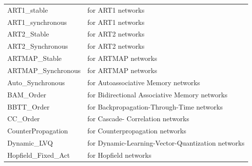 {\newpage
\clearpage
\samepage \begin{tabular}{|l|l|}
\hline
ART1\_stable \hspace{0.5cm} & \hspace{0.5cm} for ART1 networks\\  
ART1\_synchronous \hspace{0.5cm} & \hspace{0.5cm} for ART1 networks\\ 
ART2\_Stable \hspace{0.5cm} & \hspace{0.5cm} for ART2 networks\\ 
ART2\_Synchronous  \hspace{0.5cm} & \hspace{0.5cm} for ART2 networks\\ 
ARTMAP\_Stable  \hspace{0.5cm} & \hspace{0.5cm} for ARTMAP networks\\ 
ARTMAP\_Synchronous  \hspace{0.5cm} & \hspace{0.5cm} for ARTMAP networks\\ 
Auto\_Synchronous  \hspace{0.5cm} & \hspace{0.5cm} for Autoassociative Memory networks\\ 
BAM\_Order \hspace{0.5cm} & \hspace{0.5cm} for Bidirectional Associative Memory networks\\ 
BBTT\_Order \hspace{0.5cm} & \hspace{0.5cm} for Backpropagation-Through-Time networks\\ 
CC\_Order \hspace{0.5cm} & \hspace{0.5cm} for Cascade- Correlation networks\\ 
CounterPropagation \hspace{0.5cm} & \hspace{0.5cm} for Counterpropagation networks\\ 
Dynamic\_LVQ \hspace{0.5cm} & \hspace{0.5cm} for Dynamic-Learning-Vector-Quantization networks\\ 
Hopfield\_Fixed\_Act \hspace{0.5cm} & \hspace{0.5cm} for Hopfield networks\\ 

\end{tabular}}
